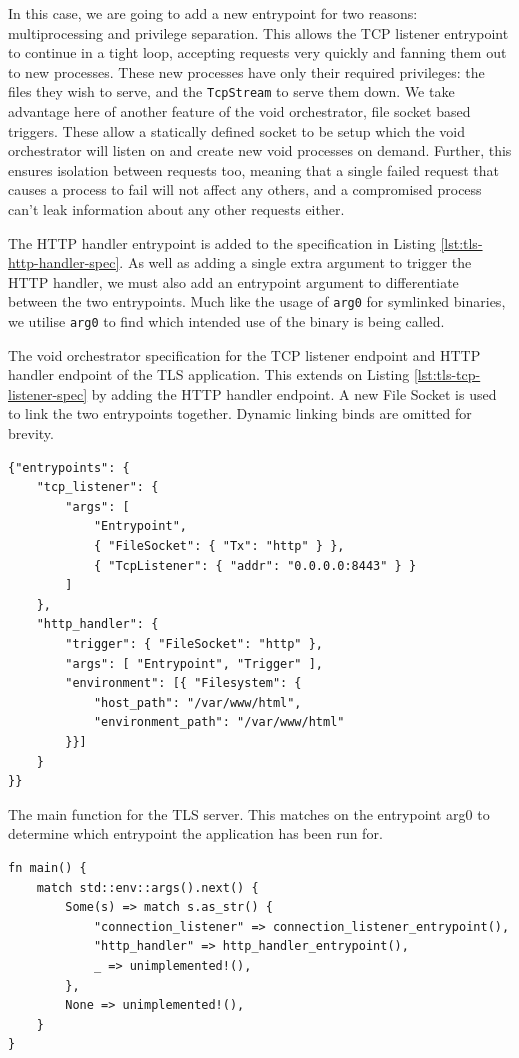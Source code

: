 \documentclass[12pt,a4paper,twoside]{report}
\begin{document}
In this case, we are going to add a new entrypoint for two reasons: multiprocessing and privilege separation. This allows the TCP listener entrypoint to continue in a tight loop, accepting requests very quickly and fanning them out to new processes. These new processes have only their required privileges: the files they wish to serve, and the \texttt{TcpStream} to serve them down. We take advantage here of another feature of the void orchestrator, file socket based triggers. These allow a statically defined socket to be setup which the void orchestrator will listen on and create new void processes on demand. Further, this ensures isolation between requests too, meaning that a single failed request that causes a process to fail will not affect any others, and a compromised process can't leak information about any other requests either.

The HTTP handler entrypoint is added to the specification in Listing \ref{lst:tls-http-handler-spec}. As well as adding a single extra argument to trigger the HTTP handler, we must also add an entrypoint argument to differentiate between the two entrypoints. Much like the usage of \texttt{arg0} for symlinked binaries, we utilise \texttt{arg0} to find which intended use of the binary is being called.

\begin{listing}
\label{lst:tls-http-handler-spec}
\caption{The void orchestrator specification for the TCP listener endpoint and HTTP handler endpoint of the TLS application. This extends on Listing \ref{lst:tls-tcp-listener-spec} by adding the HTTP handler endpoint. A new File Socket is used to link the two entrypoints together. Dynamic linking binds are omitted for brevity.}

\begin{verbatim}
{"entrypoints": {
    "tcp_listener": {
        "args": [
            "Entrypoint",
            { "FileSocket": { "Tx": "http" } },
            { "TcpListener": { "addr": "0.0.0.0:8443" } }
        ]
    },
    "http_handler": {
        "trigger": { "FileSocket": "http" },
        "args": [ "Entrypoint", "Trigger" ],
        "environment": [{ "Filesystem": {
            "host_path": "/var/www/html",
            "environment_path": "/var/www/html"
        }}]
    }
}}
\end{verbatim}
\end{listing}

\begin{listing}
\label{lst:tls-main-function}
\caption{The main function for the TLS server. This matches on the entrypoint arg0 to determine which entrypoint the application has been run for.}

\begin{verbatim}
fn main() {
    match std::env::args().next() {
        Some(s) => match s.as_str() {
            "connection_listener" => connection_listener_entrypoint(),
            "http_handler" => http_handler_entrypoint(),
            _ => unimplemented!(),
        },
        None => unimplemented!(),
    }
}
\end{verbatim}
\end{listing}
\end{document}
